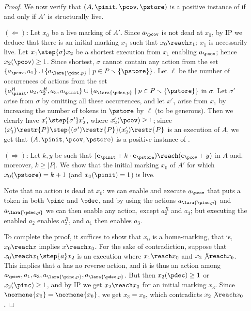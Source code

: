 \begin{proof}
We now verify that  
 $(A,\pinit,\pcov,\pstore)$ is a positive instance of \PPSCover if and
 only if $A'$ is structurally live.

$(\Leftarrow)$:	
		Let $x_0$ be a live marking of
		$A'$. Since $a_\pcov$ is not dead at $x_0$, by \textsc{IP}
we deduce that	there is an initial marking $x_1$ such that $x_0\reach
		x_1$; $x_1$ is necessarily live. 
		Let $x_1\step{\sigma}x_2$ be a shortest execution from
		$x_1$ enabling $a_\pcov$; hence $x_2(\pcov)\geq 1$.
Since shortest, $\sigma$ cannot contain any action from the set 
		$\{a_\pcov,a_1\}\cup \{a_\lara{\pinc,p}\mid p\in
		P\smallsetminus\{\pstore\}\}$.
Let $\ell$ be the number of occurrences of actions
		from the set
		$\{a^R_\pinit,a_2,a^R_2,a_3,a_\pinit\}\cup 
		\{a_\lara{\pdec,p}\mid p\in
		P\smallsetminus\{\pstore\}\}$ in $\sigma$.
Let $\sigma'$ arise from $\sigma$ by omitting all these occurrences,
		and let $x'_1$ arise from $x_1$ by
		increasing the number of tokens in $\pstore$ by
		$\ell$ (to be generous). Then we clearly have
		$x'_1\step{\sigma'}x'_2$, where $x'_2(\pcov)\geq 1$;
		since
		$(x'_1)\restr{P}\step{(\sigma')\restr{P}}(x'_2)\restr{P}$
		is an execution of $A$, we get that 
 $(A,\pinit,\pcov,\pstore)$ is a
		positive instance of \PPSCover.

		$(\Rightarrow)$:
		Let $k,y$ be such that 
		$(\mathbf{e}_\pinit+k\cdot \mathbf{e}_\pstore)\reach
	(\mathbf{e}_\pcov+y)$ in $A$ and, moreover, $k\geq |P|$.  We  show that 
		the initial marking $x_0$ of $A'$ for which	
		$x_0(\pstore)=k+1$ (and	$x_0(\pinit)=1$) is
		live.

Note that no action is dead at $x_0$: we can enable and
		execute
		$a_\pcov$ that puts a token in both $\pinc$ and $\pdec$, and by
		using the actions $a_\lara{\pinc,p}$ and
		$a_\lara{\pdec,p}$ we can then enable any action, except
		$a^R_2$ and $a_3$; but executing the enabled $a_2$
		enables $a^R_2$, and $a_1$ then enables $a_3$.

To complete the proof,
		it suffices to show that $x_0$ is a
		home-marking, that is, $x_0\reach x$ implies
$x\reach x_0$. For the sake of contradiction,
suppose that 
	$x_0\reach x_1\step{a}x_2$ is an execution where $x_1\reach x_0$
		and $x_2\not\reach x_0$. This implies that $a$ has no reverse
		action, and it is thus an action among
		$a_\pcov,a_1,a_3,a_\lara{\pinc,p},a_\lara{\pdec,p}$. But
		then $x_2(\pdec)\geq 1$ or  $x_2(\pinc)\geq 1$,
and by \textsc{IP} we get $x_2\reach
		x_3$ for an initial marking $x_3$. Since
		$\normone{x_3}=\normone{x_0}$, we get 
 $x_3=x_0$, which contradicts $x_2\not\reach x_0$.
\end{proof}
